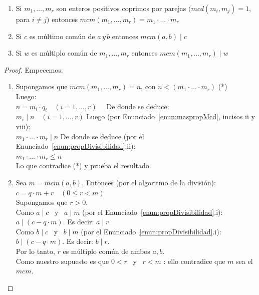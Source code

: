 \begin{enunciado} \label{enun:propmcm}\leavevmode\par
\begin{enumerate}[label=\roman*)]
\item Si $m_{1}, \ldots, m_{r}$ son enteros positivos coprimos por parejas $(mcd(m_{i}, m_{j})=1$, para $i \neq j)$ entonces $mcm(m_{1}, \ldots, m_{r})=m_{1} \cdot \ldots \cdot m_{r}$
\item Si $c$ es múltimo común de $a \, y \, b$ entonces $mcm(a,b) \mid c$
\item Si $w$ es múltiplo común de $m_{1}, \ldots, m_r$ entonces $mcm(m_{1}, \ldots, m_r) \mid w$
\end{enumerate}
\end{enunciado}

\begin{proof} Empecemos:
\begin{enumerate}[label=\roman*)]
\item Supongamos que $mcm(m_{1}, \ldots, m_{r})=n$, con $n<(m_{1} \cdot \ldots \cdot m_{r})$ \quad\quad (*)  \\
Luego:\\
$n=m_{i} \cdot q_{i} \quad(i=1, \ldots, r) \quad$ De donde se deduce:\\
$m_{i} \mid n \quad(i=1, \ldots, r)$ \quad\quad\quad Luego (por Enunciado~\ref{enun:maspropMcd}, incisos ii y viii): \\
$m_{1} \cdot \ldots \cdot m_{r} \mid n$ \quad\quad\quad\quad\quad\; De donde se deduce (por el Enunciado~\ref{enun:propDivisibilidad}.ii):\\
$m_{1} \cdot \ldots \cdot m_{r} \leq n$ \\
Lo que contradice (*) y prueba el resultado.
\item Sea $m=mcm(a, b)$. Entonces (por el algoritmo de la división): \\
$c=q \cdot m+r \quad(0 \leq r < m)$ \\
Supongamos que $r>0$.\\
Como $a \mid c$ \, y \, $a \mid m$ (por el Enunciado~\ref{enun:propDivisibilidad}.i): $a \mid (c-q \cdot m)$. Es decir: $a\mid r$. \\
Como $b \mid c$ \, y \, $b\mid m$ (por el Enunciado~\ref{enun:propDivisibilidad}.i): $b \mid (c-q \cdot m)$. Es decir: $b\mid r$. \\
Por lo tanto, $r$ es múltiplo común de ambos $a,b$.\\
Como nuestro supuesto es que $0<r$ \, y \, $r<m$ : ello contradice que $m$ sea el $mcm$.\\

\end{enumerate}
\end{proof}
